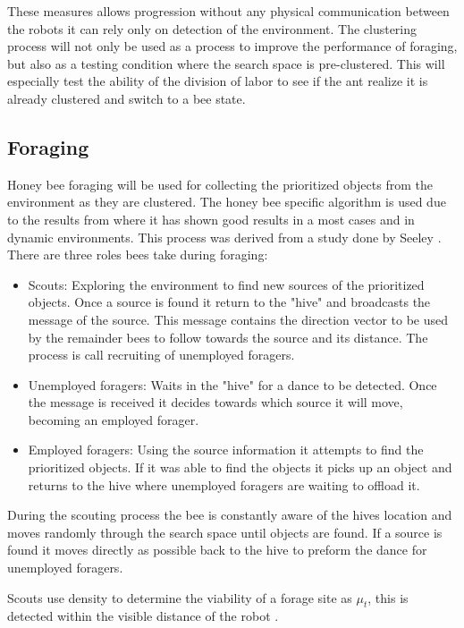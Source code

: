 \documentclass[12pt]{article}
\begin{document}
{\par{These measures allows progression without any physical communication between the robots it can rely only on detection of the environment. The clustering process will not only be used as a process to improve the performance of foraging, but also as a testing condition where the search space is pre-clustered. This will especially test the ability of the division of labor to see if the ant realize it is already clustered and switch to a bee state.}

\subsection{Foraging}
\par{Honey bee foraging will be used for collecting the prioritized objects from the environment as they are clustered. The honey bee specific algorithm is used due to the results from \cite{Jade-2014} where it has shown good results in a most cases and in dynamic environments. This process was derived from a study done by Seeley \cite{T-Seeley}. There are three roles bees take during foraging:}

\begin{itemize}
	\item Scouts: Exploring the environment to find new sources of the prioritized objects. Once a source is found it return to the "hive" and broadcasts the message of the source. This message contains the direction vector to be used by the remainder bees to follow towards the source and its distance. The process is call recruiting of unemployed foragers.
	\item Unemployed foragers: Waits in the "hive" for a dance to be detected. Once the message is received it decides towards which source it will move, becoming an employed forager. 
	\item Employed foragers: Using the source information it attempts to find the prioritized objects. If it was able to find the objects it picks up an object and returns to the hive where unemployed foragers are waiting to offload it.
\end{itemize}

\par{During the scouting process the bee is constantly aware of the hives location and moves randomly through the search space until objects are found. If a source is found it moves directly as possible back to the hive to preform the dance for unemployed foragers.}
\\
\par{Scouts use density to determine the viability of a forage site as \( \mu_{t} \), this is detected within the visible distance of the robot \cite{T-Seeley}.}

}
\end{document}
